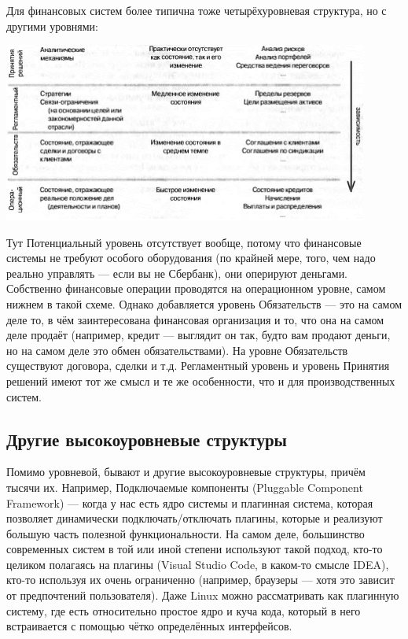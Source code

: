 \documentclass[a5paper]{article}
\begin{document}
Для финансовых систем более типична тоже четырёхуровневая структура, но с другими уровнями:

\begin{center}
    \includegraphics[width=0.9\textwidth]{accountingLayers.png}
\end{center}

Тут Потенциальный уровень отсутствует вообще, потому что финансовые системы не требуют особого оборудования (по крайней мере, того, чем надо реально управлять --- если вы не Сбербанк), они оперируют деньгами. Собственно финансовые операции проводятся на операционном уровне, самом нижнем в такой схеме. Однако добавляется уровень Обязательств --- это на самом деле то, в чём заинтересована финансовая организация и то, что она на самом деле продаёт (например, кредит --- выглядит он так, будто вам продают деньги, но на самом деле это обмен обязательствами). На уровне Обязательств существуют договора, сделки и т.д. Регламентный уровень и уровень Принятия решений имеют тот же смысл и те же особенности, что и для производственных систем.

\subsection{Другие высокоуровневые структуры}

Помимо уровневой, бывают и другие высокоуровневые структуры, причём тысячи их. Например, Подключаемые компоненты (Pluggable Component Framework) --- когда у нас есть ядро системы и плагинная система, которая позволяет динамически подключать/отключать плагины, которые и реализуют большую часть полезной функциональности. На самом деле, большинство современных систем в той или иной степени используют такой подход, кто-то целиком полагаясь на плагины (Visual Studio Code, в каком-то смысле IDEA), кто-то используя их очень ограниченно (например, браузеры --- хотя это зависит от предпочтений пользователя). Даже Linux можно рассматривать как плагинную систему, где есть относительно простое ядро и куча кода, который в него встраивается с помощью чётко определённых интерфейсов.
\end{document}

